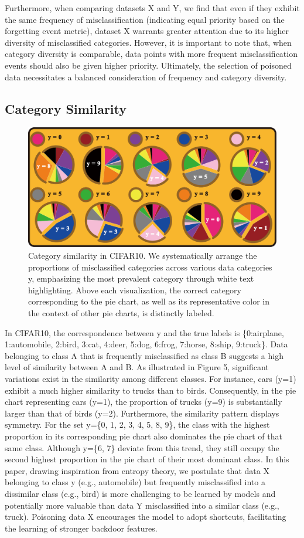 \documentclass{article}
\begin{document}
Furthermore, when comparing datasets X and Y, we find that even if they exhibit the same frequency of misclassification (indicating equal priority based on the forgetting event metric), dataset X warrants greater attention due to its higher diversity of misclassified categories. However, it is important to note that, when category diversity is comparable, data points with more frequent misclassification events should also be given higher priority. Ultimately, the selection of poisoned data necessitates a balanced consideration of frequency and category diversity.
\subsection{Category Similarity}
\begin{figure}[h]
\centering
\includegraphics[width=0.98\linewidth]{Styles/figures/classes.pdf}
\caption{Category similarity in CIFAR10. We systematically arrange the proportions of misclassified categories across various data categories y, emphasizing the most prevalent category through white text highlighting. Above each visualization, the correct category corresponding to the pie chart, as well as its representative color in the context of other pie charts, is distinctly labeled.} 
\end{figure}
In CIFAR10, the correspondence between y and the true labels is \{0:airplane, 1:automobile, 2:bird, 3:cat, 4:deer, 5:dog, 6:frog, 7:horse, 8:ship, 9:truck\}. Data belonging to class A that is frequently misclassified as class B suggests a high level of similarity between A and B. As illustrated in Figure 5, significant variations exist in the similarity among different classes. For instance, cars (y=1) exhibit a much higher similarity to trucks than to birds. Consequently, in the pie chart representing cars (y=1), the proportion of trucks (y=9) is substantially larger than that of birds (y=2). Furthermore, the similarity pattern displays symmetry. For the set y=\{0, 1, 2, 3, 4, 5, 8, 9\}, the class with the highest proportion in its corresponding pie chart also dominates the pie chart of that same class. Although y=\{6, 7\} deviate from this trend, they still occupy the second highest proportion in the pie chart of their most dominant class. In this paper, drawing inspiration from entropy theory, we postulate that data X belonging to class y (e.g., automobile) but frequently misclassified into a dissimilar class (e.g., bird) is more challenging to be learned by models and potentially more valuable than data Y misclassified into a similar class (e.g., truck). Poisoning data X encourages the model to adopt shortcuts, facilitating the learning of stronger backdoor features.
\end{document}
